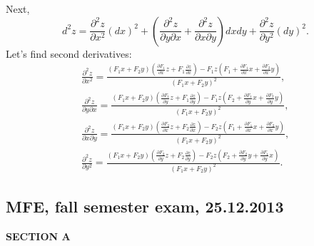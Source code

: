 \documentclass[12pt]{article} %
\theoremstyle{definition} %
\begin{document}
\begin{enumerate}
Next,
$$
d^2z = \frac{\partial^2 z}{\partial x^2} (dx)^2 + (\frac{\partial^2 z}{\partial y \partial x}+\frac{\partial^2 z}{\partial x\partial y}) dx dy + \frac{\partial^2 z}{\partial y^2} (dy)^2.
$$
Let's find second derivatives:
\begin{align*}
\frac{\partial^2 z}{\partial x^2}= \frac{(F_1 x+F_2 y)(\frac{\partial F_1}{\partial x} z + F_1 \frac{\partial z}{\partial x} ) - F_1 z(F_1 + \frac{\partial F_1}{\partial x} x + \frac{\partial F_2}{\partial x} y)}{(F_1 x+F_2 y)^2},\\
%
\frac{\partial^2 z}{\partial y \partial x} = \frac{(F_1 x+F_2 y)(\frac{\partial F_1}{\partial y} z + F_1 \frac{\partial z}{\partial y} ) - F_1 z(F_2 + \frac{\partial F_1}{\partial y}x +\frac{\partial F_2}{\partial y} y)}{(F_1 x+F_2 y)^2},\\
%
\frac{\partial^2 z}{\partial x\partial y} = \frac{(F_1 x+F_2 y)(\frac{\partial F_2}{\partial x} z + F_2 \frac{\partial z}{\partial x} ) - F_2 z(F_1 + \frac{\partial F_1}{\partial x}x +\frac{\partial F_2}{\partial x} y)}{(F_1 x+F_2 y)^2},\\
%
\frac{\partial^2 z}{\partial y^2} = \frac{(F_1 x+F_2 y)(\frac{\partial F_2}{\partial y} z + F_2 \frac{\partial z}{\partial y} ) - F_2 z(F_2 + \frac{\partial F_2}{\partial y} y + \frac{\partial F_1}{\partial y} x)}{(F_1 x+F_2 y)^2}.
\end{align*}


\end{enumerate}

\subsection{MFE, fall semester exam, 25.12.2013}

\textbf{SECTION A}
\end{document}
